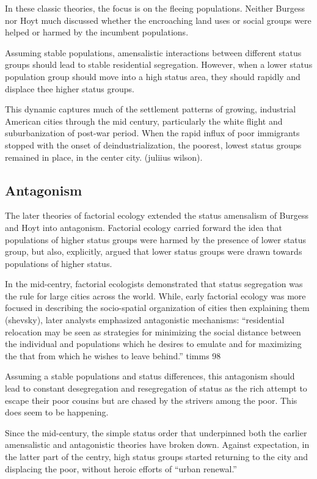 In these classic theories, the focus is on the fleeing populations.
Neither Burgess nor Hoyt much discussed whether the encroaching land
uses or social groups were helped or harmed by the incumbent
populations.

Assuming stable populations, amensalistic interactions between
different status groups should lead to stable residential
segregation. However, when a lower status population group should move
into a high status area, they should rapidly and displace thee higher
status groups.

This dynamic captures much of the settlement patterns of growing,
industrial American cities through the mid century, particularly the
white flight and suburbanization of post-war period. When the rapid
influx of poor immigrants stopped with the onset of
deindustrialization, the poorest, lowest status groups remained in
place, in the center city. (juliius wilson).

\subsection{Antagonism}
The later theories of factorial ecology extended the status amensalism
of Burgess and Hoyt into antagonism. Factorial ecology carried forward
the idea that populations of higher status groups were harmed by the
presence of lower status group, but also, explicitly, argued that
lower status groups were drawn towards populations of higher status.

In the mid-centry, factorial ecologists demonstrated that status
segregation was the rule for large cities across the world. While,
early factorial ecology was more focused in describing the
socio-spatial organization of cities then explaining them (shevsky),
later analysts emphasized antagonistic mechanisms: ``residential
relocation may be seen as strategies for minimizing the social
distance between the individual and populations which he desires to
emulate and for maximizing the that from which he wishes to leave
behind.'' timms 98

Assuming a stable populations and status differences, this antagonism
should lead to constant desegregation and resegregation of status as
the rich attempt to escape their poor cousins but are chased by the
strivers among the poor. This does seem to be happening.

Since the mid-century, the simple status order that underpinned
both the earlier amensalistic and antagonistic theories have broken down.
Against expectation, in the latter part of the centry, high status
groups started returning to the city and displacing the poor, without
heroic efforts of ``urban renewal.''

